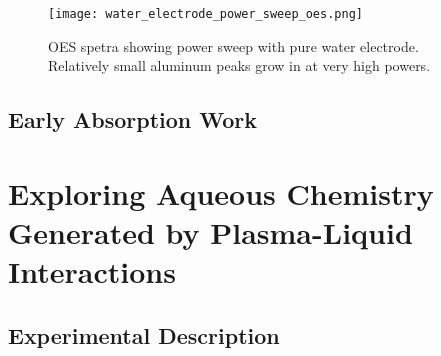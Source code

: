 \begin{figure}[htbp]
  \centering
  \texttt{[image: water\_electrode\_power\_sweep\_oes.png]}
  \caption{OES spetra showing power sweep with pure water electrode. Relatively small aluminum peaks grow in at very high powers.}
  \label{fig:pow_sweep_water}
\end{figure}


\subsection{Early Absorption Work}


\section{Exploring Aqueous Chemistry Generated by Plasma-Liquid Interactions}
\label{sec:aq_chem}

\subsection{Experimental Description}

